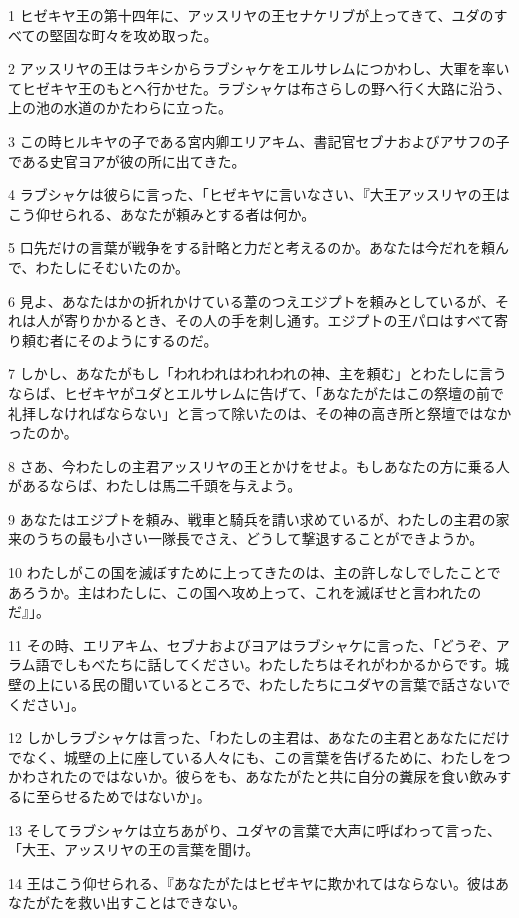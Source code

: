 \par 1 ヒゼキヤ王の第十四年に、アッスリヤの王セナケリブが上ってきて、ユダのすべての堅固な町々を攻め取った。
\par 2 アッスリヤの王はラキシからラブシャケをエルサレムにつかわし、大軍を率いてヒゼキヤ王のもとへ行かせた。ラブシャケは布さらしの野へ行く大路に沿う、上の池の水道のかたわらに立った。
\par 3 この時ヒルキヤの子である宮内卿エリアキム、書記官セブナおよびアサフの子である史官ヨアが彼の所に出てきた。
\par 4 ラブシャケは彼らに言った、「ヒゼキヤに言いなさい、『大王アッスリヤの王はこう仰せられる、あなたが頼みとする者は何か。
\par 5 口先だけの言葉が戦争をする計略と力だと考えるのか。あなたは今だれを頼んで、わたしにそむいたのか。
\par 6 見よ、あなたはかの折れかけている葦のつえエジプトを頼みとしているが、それは人が寄りかかるとき、その人の手を刺し通す。エジプトの王パロはすべて寄り頼む者にそのようにするのだ。
\par 7 しかし、あなたがもし「われわれはわれわれの神、主を頼む」とわたしに言うならば、ヒゼキヤがユダとエルサレムに告げて、「あなたがたはこの祭壇の前で礼拝しなければならない」と言って除いたのは、その神の高き所と祭壇ではなかったのか。
\par 8 さあ、今わたしの主君アッスリヤの王とかけをせよ。もしあなたの方に乗る人があるならば、わたしは馬二千頭を与えよう。
\par 9 あなたはエジプトを頼み、戦車と騎兵を請い求めているが、わたしの主君の家来のうちの最も小さい一隊長でさえ、どうして撃退することができようか。
\par 10 わたしがこの国を滅ぼすために上ってきたのは、主の許しなしでしたことであろうか。主はわたしに、この国へ攻め上って、これを滅ぼせと言われたのだ』」。
\par 11 その時、エリアキム、セブナおよびヨアはラブシャケに言った、「どうぞ、アラム語でしもべたちに話してください。わたしたちはそれがわかるからです。城壁の上にいる民の聞いているところで、わたしたちにユダヤの言葉で話さないでください」。
\par 12 しかしラブシャケは言った、「わたしの主君は、あなたの主君とあなたにだけでなく、城壁の上に座している人々にも、この言葉を告げるために、わたしをつかわされたのではないか。彼らをも、あなたがたと共に自分の糞尿を食い飲みするに至らせるためではないか」。
\par 13 そしてラブシャケは立ちあがり、ユダヤの言葉で大声に呼ばわって言った、「大王、アッスリヤの王の言葉を聞け。
\par 14 王はこう仰せられる、『あなたがたはヒゼキヤに欺かれてはならない。彼はあなたがたを救い出すことはできない。

